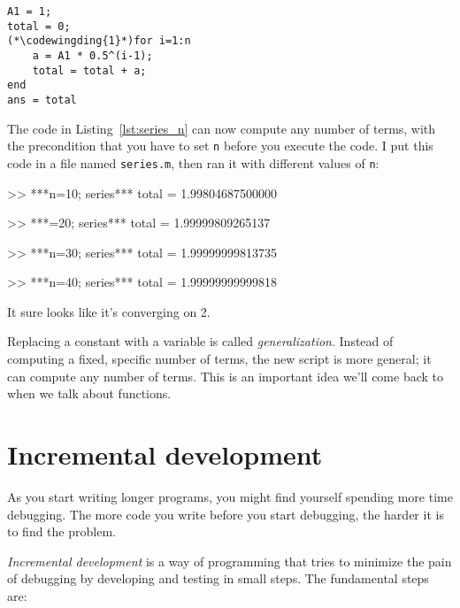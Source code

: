 \begin{lstlisting}[caption={Updating our code from Listing 1-1 to have a variable number of terms}, label={lst:series_n}]
A1 = 1;
total = 0;
(*\codewingding{1}*)for i=1:n
    a = A1 * 0.5^(i-1);
    total = total + a;
end
ans = total
\end{lstlisting}

The code in Listing~\ref{lst:series_n} can now compute any number of terms, with the
precondition that you have to set {\tt n} before you execute
the code.  
I put this code in a file named {\tt series.m}, then
ran it with different values of {\tt n}:

\begin{code}
>> ***n=10; series***
total = 1.99804687500000

>> ***=20; series***
total = 1.99999809265137

>> ***n=30; series***
total = 1.99999999813735

>> ***n=40; series***
total = 1.99999999999818
\end{code}

It sure looks like it's converging on 2.

Replacing a constant with a variable is called \emph{generalization}.
Instead of computing a fixed, specific number of terms, the new script
is more general; it can compute any number of terms.
This is an important idea we'll come back to when we talk about functions.

\section{Incremental development}


As you start writing longer programs, you might find yourself spending more time debugging.
The more code you write before you start debugging, the harder it is to find
the problem.

\emph{Incremental development} is a way of programming that tries
to minimize the pain of debugging by developing and testing in small steps.  The fundamental steps are:

